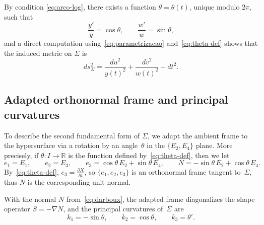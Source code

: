 \documentclass[11pt,a4paper]{amsart}
\newcommand{\n}{\nabla}
\theoremstyle{plain}
\theoremstyle{remark}
\newcommand{\R}{\mathbb{R}}
\begin{document}
By condition \eqref{eq:arco-log}, there exists a function
$\theta=\theta(t)$, unique modulo $2\pi$, such that
\begin{equation}\label{eq:theta-def}
\frac{y'}{y}=\cos\theta,
\qquad
\frac{w'}{w}=\sin\theta,
\end{equation}
and a direct computation using~\eqref{eq:parametrizacao}
and~\eqref{eq:theta-def} shows that the induced metric on $\Sigma$ is
\begin{equation}\label{eq:metrica-induzida}
ds_\Sigma^2=\frac{du^2}{y(t)^2}+\frac{dv^2}{w(t)^2}+dt^2.
\end{equation}





\subsection{Adapted orthonormal frame and principal curvatures}

To describe the second fundamental form of $\Sigma$, 
we adapt the ambient frame to the hypersurface via a rotation by an angle~$\theta$ in the $\{E_2,E_4\}$ plane.
More precisely, if $\theta\colon I \to \R$ is the function defined by~\eqref{eq:theta-def}, then we let
\begin{equation}\label{eq:darboux}
e_1=E_1,
\qquad
e_2=E_3,
\qquad
e_3=\cos\theta\,E_2+\sin\theta\,E_4,
\qquad
N=-\sin\theta\,E_2+\cos\theta\,E_4.
\end{equation}
By~\eqref{eq:theta-def}, $e_3=\frac{\partial X}{\partial t}$, so $\{e_1,e_2,e_3\}$ is an orthonormal frame tangent to~$\Sigma$, thus $N$ is the corresponding unit normal.

\begin{proposition}\label{prop:curvaturas-principais}
With the normal $N$ from~\eqref{eq:darboux}, the adapted frame diagonalizes the shape operator $S=-\n N$, and the principal curvatures of~$\Sigma$ are
\begin{equation}\label{eq:k123}
k_1=-\sin\theta,
\qquad
k_2=\cos\theta,
\qquad
k_3=\theta'.
\end{equation}
\end{proposition}
\end{document}
